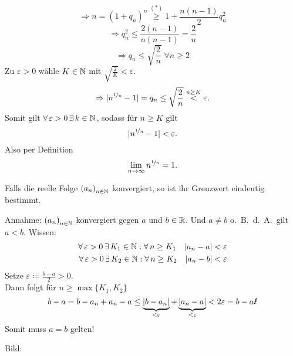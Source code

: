 \documentclass[../ana1.tex]{subfiles}
\begin{document}
\begin{bsp}
\begin{enumerate}
\begin{bew}
		\[\Rightarrow n = {(1+q_n)}^n \overset{(*)}{\geq}1+\frac{n(n-1)}{2} q_n^2\]
		\[\Rightarrow q_n^2 \leq \frac{2(n-1)}{n(n-1)} = \frac{2}{n}\]
		\[\Rightarrow q_n \leq \sqrt{\frac{2}{n}} \; \forall n\geq 2\]
		Zu \(\varepsilon >0\) wähle \(K\in\mathbb{N} \) mit \(\sqrt{\frac{2}{K}}<\varepsilon \).
		\[\Rightarrow |n^{\nicefrac{1}{n}} -1| = q_n \leq \sqrt{\frac{2}{n}} \overset{n\geq K}{<} \varepsilon.\]
		Somit gilt \( \forall \varepsilon > 0 \, \exists k\in\N \), sodass für \(n\geq K\) gilt
		\[|n^{\nicefrac{1}{n}} - 1| <\varepsilon.\]
		Also per Definition
		\[\lim\limits_{n\rightarrow\infty} n^{\nicefrac{1}{n}} = 1.\]
	\end{bew}
	\end{enumerate}
\end{bsp}

\begin{satz}
	Falls die reelle Folge \({(a_n)}_{n\in\mathbb{N}}\) konvergiert, so ist ihr Grenzwert eindeutig bestimmt.
\end{satz}
\begin{bew}
	Annahme: \({(a_n)}_{n\in\mathbb{N}}\) konvergiert gegen \(a\) und \(b\in\mathbb{R} \). Und \(a\neq b\) o.\ B.\ d.\ A.\ gilt \(a<b\).
	Wissen: 
	\begin{align*}
		\forall \varepsilon > 0 \, \exists K_1\in\N: \forall n\geq K_1 \quad |a_n -a| <\varepsilon \\
		\forall \varepsilon > 0 \, \exists K_2\in\N: \forall n\geq K_2 \quad |a_n -b| <\varepsilon
	\end{align*}
	Setze \(\varepsilon\coloneqq\frac{b-a}{2} >0\).\\
	Dann folgt für \(n\geq \max \{K_1,K_2\} \)
	\[b-a = b-a_n + a_n -a \leq \underbrace{|b-a_n|}_{<\varepsilon} + \underbrace{|a_n-a|}_{<\varepsilon} < 2\varepsilon = b-a \text{\Lightning}\]
	Somit muss \(a=b\) gelten!
\end{bew}

Bild:\\
\begin{center}
\end{center}
\end{document}
